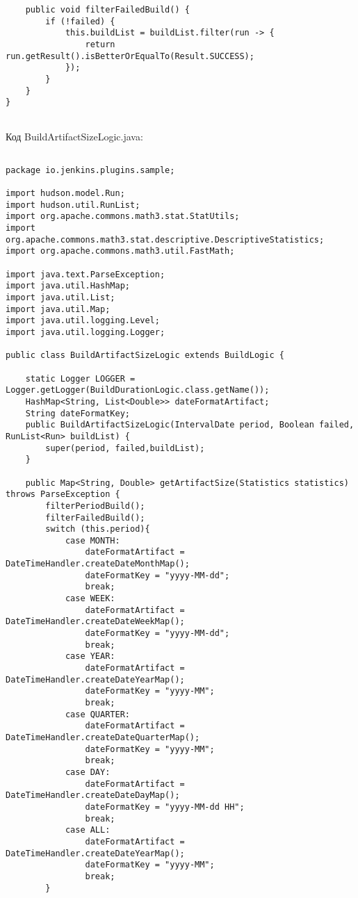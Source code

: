 \begin{lstlisting}
    public void filterFailedBuild() {
        if (!failed) {
            this.buildList = buildList.filter(run -> {
                return run.getResult().isBetterOrEqualTo(Result.SUCCESS);
            });
        }
    }
}


\end{lstlisting}

Код BuildArtifactSizeLogic.java:

\begin{lstlisting}

package io.jenkins.plugins.sample;

import hudson.model.Run;
import hudson.util.RunList;
import org.apache.commons.math3.stat.StatUtils;
import org.apache.commons.math3.stat.descriptive.DescriptiveStatistics;
import org.apache.commons.math3.util.FastMath;

import java.text.ParseException;
import java.util.HashMap;
import java.util.List;
import java.util.Map;
import java.util.logging.Level;
import java.util.logging.Logger;

public class BuildArtifactSizeLogic extends BuildLogic {

    static Logger LOGGER = Logger.getLogger(BuildDurationLogic.class.getName());
    HashMap<String, List<Double>> dateFormatArtifact;
    String dateFormatKey;
    public BuildArtifactSizeLogic(IntervalDate period, Boolean failed, RunList<Run> buildList) {
        super(period, failed,buildList);
    }

    public Map<String, Double> getArtifactSize(Statistics statistics) throws ParseException {
        filterPeriodBuild();
        filterFailedBuild();
        switch (this.period){
            case MONTH:
                dateFormatArtifact = DateTimeHandler.createDateMonthMap();
                dateFormatKey = "yyyy-MM-dd";
                break;
            case WEEK:
                dateFormatArtifact = DateTimeHandler.createDateWeekMap();
                dateFormatKey = "yyyy-MM-dd";
                break;
            case YEAR:
                dateFormatArtifact = DateTimeHandler.createDateYearMap();
                dateFormatKey = "yyyy-MM";
                break;
            case QUARTER:
                dateFormatArtifact = DateTimeHandler.createDateQuarterMap();
                dateFormatKey = "yyyy-MM";
                break;
            case DAY:
                dateFormatArtifact = DateTimeHandler.createDateDayMap();
                dateFormatKey = "yyyy-MM-dd HH";
                break;
            case ALL:
                dateFormatArtifact = DateTimeHandler.createDateYearMap();
                dateFormatKey = "yyyy-MM";
                break;
        }



\end{lstlisting}
